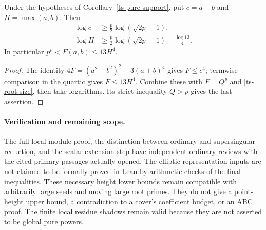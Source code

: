 \begin{corollary}\label{ts-height}
Under the hypotheses of Corollary~\ref{ts-pure-support}, put
$c=a+b$ and $H=\max(a,b)$. Then
\begin{align}
 \log c&\ge\frac p2\log(\sqrt{2p}-1),\label{ts-height-sum}\\
 \log H&\ge\frac p2\log(\sqrt{2p}-1)-\frac{\log13}{4}.
 \label{ts-height-max}
\end{align}
In particular $p^p<F(a,b)\le13H^4$.
\end{corollary}
\begin{proof}
The identity $4F=(a^2+b^2)^2+3(a+b)^4$ gives $F\le c^4$;
termwise comparison in the quartic gives $F\le13H^4$.
Combine these with $F=Q^p$ and \eqref{ts-root-size}, then take
logarithms. Its strict inequality $Q>p$ gives the last assertion.
\end{proof}

\paragraph{Verification and remaining scope.}
The full local module proof, the distinction between ordinary and
supersingular reduction, and the scalar-extension step have independent
ordinary reviews with the cited primary passages actually opened.
The elliptic representation inputs are not claimed to be formally
proved in Lean by arithmetic checks of the final inequalities.
These necessary height lower bounds remain compatible with arbitrarily
large seeds and moving large root primes. They do not give a
point-height upper bound, a contradiction to a cover's coefficient
budget, or an ABC proof. The finite local residue shadows remain
valid because they are not asserted to be global pure powers.
